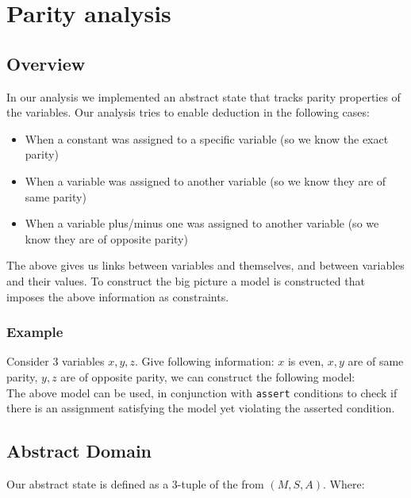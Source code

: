 \section*{Parity analysis}
\subsection*{Overview}
In our analysis we implemented an abstract state that tracks parity properties of the variables. Our analysis tries to enable deduction in the following cases:
\begin{itemize}
	\item When a constant was assigned to a specific variable (so we know the exact parity)
	\item When a variable was assigned to another variable (so we know they are of same parity)
	\item When a variable plus/minus one was assigned to another variable (so we know they are of opposite parity)
\end{itemize}
The above gives us links between variables and themselves, and between variables and their values. To construct the big picture a model is constructed that imposes the above information as constraints.
\subsubsection*{Example}
Consider 3 variables $x,y,z$. Give following information: $x$ is even, $x,y$ are of same parity, $y,z$ are of opposite parity, we can construct the following model:
\begin{equation*}
	[x_{even} \wedge (x_{even} \rightarrow y_{even}) \wedge (y_{even} \rightarrow \neg z_{even})]
\end{equation*}
The above model can be used, in conjunction with \texttt{assert} conditions to check if there is an assignment satisfying the model yet violating the asserted condition.

\subsection*{Abstract Domain}
Our abstract state is defined as a 3-tuple of the from $(M,S,A)$. Where:

